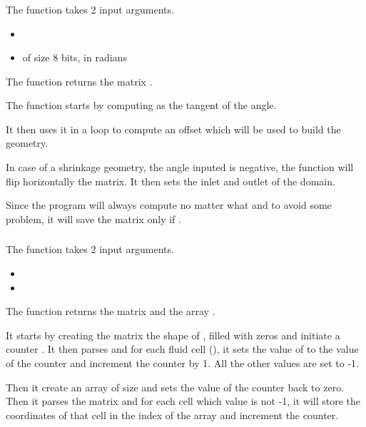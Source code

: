 \subsubsection{\textcolor{func}{}}
The function \textcolor{func}{} takes 2 input arguments.
\begin{itemize}
      \item {} \textcolor{dtype}{}
      \item {} of size 8 bits, in radians
\end{itemize}
The function returns the matrix .

The function starts by computing  as the tangent of the angle.

It then uses it in a  loop to compute an offset which will be used to
build the geometry.

In case of a shrinkage geometry, the angle inputed is negative, the function
will flip horizontally the matrix. It then sets the inlet and outlet of the
domain.

Since the program will always compute  no matter what and to avoid some
problem, it will save the matrix only if .

\subsubsection{\textcolor{func}{}}
The function \textcolor{func}{} takes 2 input
arguments.
\begin{itemize}
      \item {}
      \item {} 
\end{itemize}
The function returns the matrix  and the array .

It starts by creating the matrix  the shape of , filled with zeros
and initiate a counter . It then parses  and for each fluid
cell (), it sets the value of  to the value of the
counter and increment the counter by 1. All the other values are set to -1.

Then it create an array  of size  and
sets the value of the counter back to zero. Then it parses the matrix 
and for each cell which value is not -1, it will store the coordinates of that
cell in the index  of the array  and increment the
counter.

